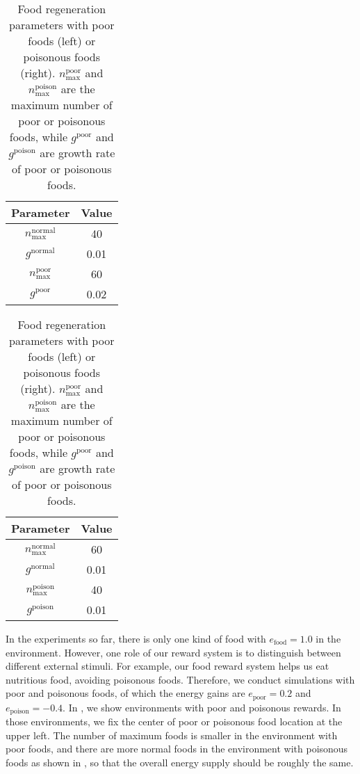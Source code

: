 \begin{table}[t]
  \begin{subtable}[h]{0.45\columnwidth}
    \centering
    \begin{tabular}{cc}
      \toprule
      Parameter & Value \\
      \midrule
      $n_{\textrm{max}}^{\textrm{normal}}$ & 40\\
      $g^{\textrm{normal}}$ & 0.01 \\
      $n_{\textrm{max}}^{\textrm{poor}}$ & 60 \\
      $g^{\textrm{poor}}$ & 0.02 \\
      \bottomrule
    \end{tabular}
  \end{subtable}
  \begin{subtable}[h]{0.45\columnwidth}
    \centering
    \begin{tabular}{cc}
      \toprule
      Parameter & Value \\
      \midrule
      $n_{\textrm{max}}^{\textrm{normal}}$ & 60\\
      $g^{\textrm{normal}}$ & 0.01 \\
      $n_{\textrm{max}}^{\textrm{poison}}$ & 40 \\
      $g^{\textrm{poison}}$ & 0.01 \\
      \bottomrule
    \end{tabular}
  \end{subtable}
  \caption{
    Food regeneration parameters with poor foods (left) or poisonous foods (right).
    $n_{\textrm{max}}^{\textrm{poor}}$ and $n_{\textrm{max}}^{\textrm{poison}}$ are the maximum number of poor or poisonous foods, while $g^{\textrm{poor}}$ and $g^{\textrm{poison}}$ are growth rate of poor or poisonous foods.
  }\label{table:pp}
\end{table}

In the experiments so far, there is only one kind of food with $e_{\mathrm{food}} = 1.0$ in the environment. However, one role of our reward system is to distinguish between different external stimuli. For example, our food reward system helps us eat nutritious food, avoiding poisonous foods. Therefore, we conduct simulations with poor and poisonous foods, of which the energy gains are $e_{\mathrm{poor}} = 0.2$ and $e_{\mathrm{poison}} = -0.4$. In , we show environments with poor and poisonous rewards. In those environments, we fix the center of poor or poisonous food location at the upper left. The number of maximum foods is smaller in the environment with poor foods, and there are more normal foods in the environment with poisonous foods as shown in , so that the overall energy supply should be roughly the same.

